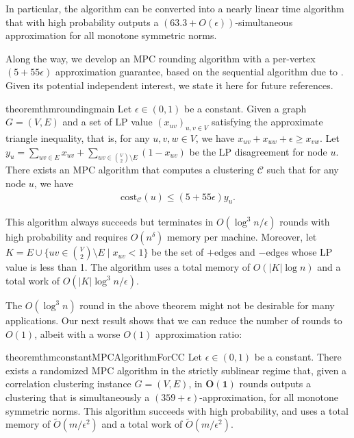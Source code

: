 \documentclass[11pt]{article}
\newcommand{\cost}{\mathrm{cost}}
\newcommand{\calC}{{\mathcal{C}}}
\begin{document}
\begin{CJK*}{UTF8}{gbsn}
In particular, the algorithm can be converted into a nearly linear time algorithm that with high probability outputs a $(63.3+O(\epsilon))$-simultaneous approximation for all monotone symmetric norms. \smallskip

Along the way, we develop an MPC rounding algorithm with a per-vertex $(5 + 55\epsilon)$ approximation guarantee, based on the sequential algorithm due to \cite{kalhan2019correlation}. Given its potential independent interest, we state it here for future references.
\begin{restatable}{theorem}{thmroundingmain}
\label{thm:roundingmaintheorem}
Let $\epsilon \in (0,1)$ be a constant. Given a graph $G = (V, E)$ and a set of LP value $( x_{uv} )_{u,v \in V}$ satisfying the approximate triangle inequality, that is, for any $u,v,w \in V$, we have $x_{uv} + x_{uw} + \epsilon \geq x_{vw}$. Let $y_u = \sum_{uv \in E} x_{uv} + \sum_{uv \in {V \choose 2} \setminus E}(1 - x_{uv})$ be the LP disagreement for node $u$. There exists an MPC algorithm that computes a clustering $\calC$ such that for any node $u$, we have 
\begin{align*}
    \cost_{\calC}(u) \leq (5 + 55\epsilon) y_u.
\end{align*}

This algorithm always succeeds but terminates in $O(\log^3 n / \epsilon)$ rounds with high probability and requires $O(n^\delta)$ memory per machine. Moreover, let $K = E \cup \{ uv \in {V \choose 2} \setminus E \mid x_{uv} < 1 \}$ be the set of $+$edges and $-$edges whose LP value is less than 1. The algorithm uses a total memory of $O(|K|\log n)$ and a total work of $O(|K|\log^3 n /\epsilon)$.
\end{restatable}



The $O(\log^3 n)$ round in the above theorem might not be desirable for many applications. Our next result shows that we can reduce the number of rounds to $O(1)$, albeit with a worse $O(1)$ approximation ratio:
\begin{restatable}{theorem}{thmconstantMPCAlgorithmForCC} \label{thm:constantMPCAlgorithmForCC}
Let $\epsilon \in (0, 1)$ be a constant.
There exists a randomized MPC algorithm in the strictly sublinear regime that, given a correlation clustering instance $G = (V, E)$, in $\mathbf{O(1)}$ rounds outputs a clustering that is simultaneously a $(359 + \epsilon)$-approximation, for all monotone symmetric norms. This algorithm succeeds with high probability, and uses a total memory of $\tilde{O}(m / \epsilon^2)$ and a total work of $\tilde{O}(m / \epsilon^2)$.
\end{restatable}




\end{CJK*}
\end{document}
